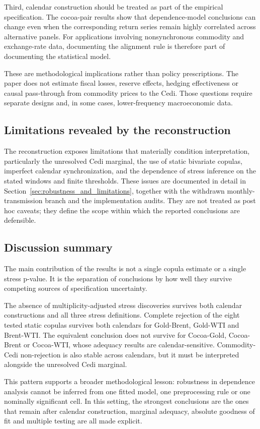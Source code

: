 Third, calendar construction should be treated as part of the empirical specification. The cocoa-pair results show that dependence-model conclusions can change even when the corresponding return series remain highly correlated across alternative panels. For applications involving nonsynchronous commodity and exchange-rate data, documenting the alignment rule is therefore part of documenting the statistical model.

These are methodological implications rather than policy prescriptions. The paper does not estimate fiscal losses, reserve effects, hedging effectiveness or causal pass-through from commodity prices to the Cedi. Those questions require separate designs and, in some cases, lower-frequency macroeconomic data.

\subsection{Limitations revealed by the reconstruction}

The reconstruction exposes limitations that materially condition interpretation, particularly the unresolved Cedi marginal, the use of static bivariate copulas, imperfect calendar synchronization, and the dependence of stress inference on the stated windows and finite thresholds. These issues are documented in detail in Section~\ref{sec:robustness_and_limitations}, together with the withdrawn monthly-transmission branch and the implementation audits. They are not treated as post hoc caveats; they define the scope within which the reported conclusions are defensible.

\subsection{Discussion summary}

The main contribution of the results is not a single copula estimate or a single stress p-value. It is the separation of conclusions by how well they survive competing sources of specification uncertainty.

The absence of multiplicity-adjusted stress discoveries survives both calendar constructions and all three stress definitions. Complete rejection of the eight tested static copulas survives both calendars for Gold-Brent, Gold-WTI and Brent-WTI. The equivalent conclusion does not survive for Cocoa-Gold, Cocoa-Brent or Cocoa-WTI, whose adequacy results are calendar-sensitive. Commodity-Cedi non-rejection is also stable across calendars, but it must be interpreted alongside the unresolved Cedi marginal.

This pattern supports a broader methodological lesson: robustness in dependence analysis cannot be inferred from one fitted model, one preprocessing rule or one nominally significant cell. In this setting, the strongest conclusions are the ones that remain after calendar construction, marginal adequacy, absolute goodness of fit and multiple testing are all made explicit.
